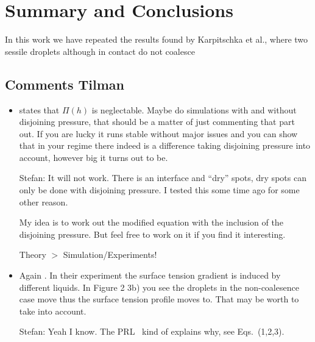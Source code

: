 \documentclass[twocolumn,amsmath,amssymb,showpacs,pre,nofootinbib,superscriptaddress]{revtex4-1} %
\begin{document}
\section{Summary and Conclusions}\label{sec:sum_conclu}
In this work we have repeated the results found by Karpitschka et al., where two sessile droplets although in contact do not coalesce~\cite{karpitschka2014sharp, doi:10.1021/la500459v}

\begin{acknowledgements}

\end{acknowledgements}
\subsection{Comments Tilman}

\begin{itemize}
    \item \cite{doi:10.1021/la500459v} states that $\Pi(h)$ is neglectable. Maybe do simulations with and without disjoining pressure, that should be a matter of just commenting that part out. If you are lucky it runs stable without major issues and you can show that in your regime there indeed is a difference taking disjoining pressure into account, however big it turns out to be. 
    
    \textcolor{pyblue}{Stefan}: It will not work.
    There is an interface and ``dry'' spots, dry spots can only be done with disjoining pressure.
    I tested this some time ago for some other reason.
    
    My idea is to work out the modified equation with the inclusion of the disjoining pressure.
    But feel free to work on it if you find it interesting.
    
    Theory $>$ Simulation/Experiments!
    
    \item Again \cite{doi:10.1021/la500459v}. In their experiment the surface tension gradient is induced by different liquids. In Figure 2 3b) you see the droplets in the non-coalesence case move thus the surface tension profile moves to. That may be worth to take into account.
    
    \textcolor{pyblue}{Stefan}: Yeah I know.
    The PRL~\cite{PhysRevLett.109.066103} kind of explains why, see Eqs.~(1,2,3).
\end{itemize}

%



\end{document}
